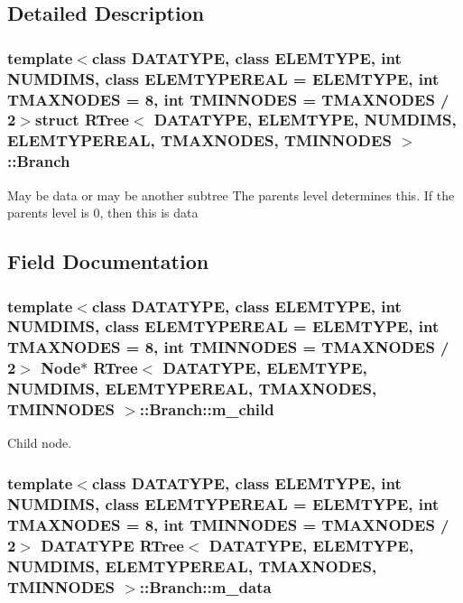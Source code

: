 \subsection{Detailed Description}
\subsubsection*{template$<$class D\-A\-T\-A\-T\-Y\-P\-E, class E\-L\-E\-M\-T\-Y\-P\-E, int N\-U\-M\-D\-I\-M\-S, class E\-L\-E\-M\-T\-Y\-P\-E\-R\-E\-A\-L = E\-L\-E\-M\-T\-Y\-P\-E, int T\-M\-A\-X\-N\-O\-D\-E\-S = 8, int T\-M\-I\-N\-N\-O\-D\-E\-S = T\-M\-A\-X\-N\-O\-D\-E\-S / 2$>$struct R\-Tree$<$ D\-A\-T\-A\-T\-Y\-P\-E, E\-L\-E\-M\-T\-Y\-P\-E, N\-U\-M\-D\-I\-M\-S, E\-L\-E\-M\-T\-Y\-P\-E\-R\-E\-A\-L, T\-M\-A\-X\-N\-O\-D\-E\-S, T\-M\-I\-N\-N\-O\-D\-E\-S $>$\-::\-Branch}

May be data or may be another subtree The parents level determines this. If the parents level is 0, then this is data 

\subsection{Field Documentation}
\hypertarget{structRTree_1_1Branch_aa15f22000d06c726372eb84f46db0fa0}{
\subsubsection[{m\-\_\-child}]{\setlength{\rightskip}{0pt plus 5cm}template$<$class D\-A\-T\-A\-T\-Y\-P\-E, class E\-L\-E\-M\-T\-Y\-P\-E, int N\-U\-M\-D\-I\-M\-S, class E\-L\-E\-M\-T\-Y\-P\-E\-R\-E\-A\-L = E\-L\-E\-M\-T\-Y\-P\-E, int T\-M\-A\-X\-N\-O\-D\-E\-S = 8, int T\-M\-I\-N\-N\-O\-D\-E\-S = T\-M\-A\-X\-N\-O\-D\-E\-S / 2$>$ {\bf Node}$\ast$ {\bf R\-Tree}$<$ D\-A\-T\-A\-T\-Y\-P\-E, E\-L\-E\-M\-T\-Y\-P\-E, N\-U\-M\-D\-I\-M\-S, E\-L\-E\-M\-T\-Y\-P\-E\-R\-E\-A\-L, T\-M\-A\-X\-N\-O\-D\-E\-S, T\-M\-I\-N\-N\-O\-D\-E\-S $>$\-::Branch\-::m\-\_\-child}}\label{structRTree_1_1Branch_aa15f22000d06c726372eb84f46db0fa0}


Child node. 

\hypertarget{structRTree_1_1Branch_afc1aee31a1a62ad4e800a536a3a9d665}{
\subsubsection[{m\-\_\-data}]{\setlength{\rightskip}{0pt plus 5cm}template$<$class D\-A\-T\-A\-T\-Y\-P\-E, class E\-L\-E\-M\-T\-Y\-P\-E, int N\-U\-M\-D\-I\-M\-S, class E\-L\-E\-M\-T\-Y\-P\-E\-R\-E\-A\-L = E\-L\-E\-M\-T\-Y\-P\-E, int T\-M\-A\-X\-N\-O\-D\-E\-S = 8, int T\-M\-I\-N\-N\-O\-D\-E\-S = T\-M\-A\-X\-N\-O\-D\-E\-S / 2$>$ D\-A\-T\-A\-T\-Y\-P\-E {\bf R\-Tree}$<$ D\-A\-T\-A\-T\-Y\-P\-E, E\-L\-E\-M\-T\-Y\-P\-E, N\-U\-M\-D\-I\-M\-S, E\-L\-E\-M\-T\-Y\-P\-E\-R\-E\-A\-L, T\-M\-A\-X\-N\-O\-D\-E\-S, T\-M\-I\-N\-N\-O\-D\-E\-S $>$\-::Branch\-::m\-\_\-data}}\label{structRTree_1_1Branch_afc1aee31a1a62ad4e800a536a3a9d665}


